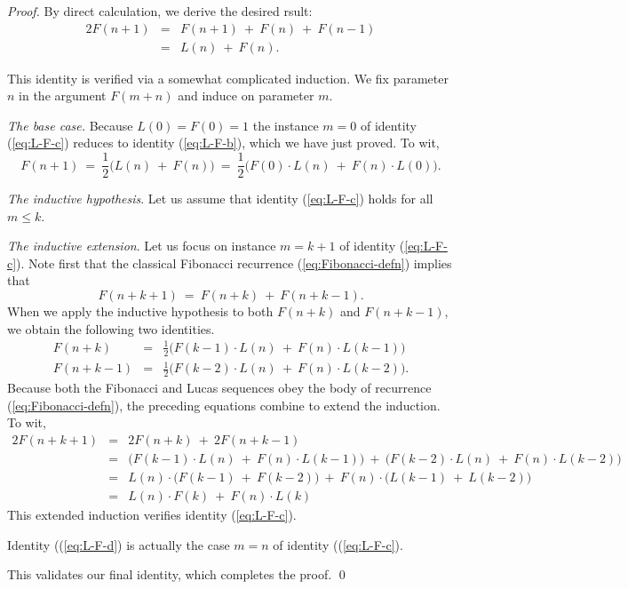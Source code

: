\begin{proof}
\bigskip

By direct calculation, we derive the desired rsult:
\begin{eqnarray*}
2 F(n+1) & = & F(n+1) \ + \ F(n) \ + \ F(n-1) \\
         & = & L(n) \ + \ F(n).
\end{eqnarray*}

\bigskip

This identity is verified via a somewhat complicated induction.  We
fix parameter $n$ in the argument $F(m+n)$ and induce on parameter $m$.

\medskip

\noindent
{\it The base case.}
Because $L(0) = F(0)= 1$ the instance $m=0$ of identity
(\ref{eq:L-F-c}) reduces to identity (\ref{eq:L-F-b}), which we have
just proved.  To wit,
\[ F(n+1) \ = \ \frac{1}{2} \big( L(n) \ + \ F(n) \big)
\ = \ \frac{1}{2} \big( F(0) \cdot L(n) \ + \ F(n) \cdot L(0) \big).
\]

\medskip 

\noindent
{\it The inductive hypothesis}.
Let us assume that identity (\ref{eq:L-F-c}) holds for all $m \leq k$.

\medskip

\noindent
{\it The inductive extension}.
Let us focus on instance $m = k+1$ of identity (\ref{eq:L-F-c}).  Note
first that the classical Fibonacci recurrence
(\ref{eq:Fibonacci-defn}) implies that
\[ F(n + k +1) \ = \ F(n + k) \ + \ F(n + k - 1). \]
When we apply the inductive hypothesis to both $F(n + k)$ and $F(n + k
- 1)$, we obtain the following two identities.
\begin{eqnarray*}
F(n + k) & = & \frac{1}{2} \big( F(k-1) \cdot L(n) \ + \ F(n) \cdot
L(k-1) \big) \\
F(n + k - 1) & = & \frac{1}{2} \big( F(k-2) \cdot L(n) \ + \ F(n) \cdot L(k-2) \big).
\end{eqnarray*}
Because both the Fibonacci and Lucas sequences obey the body of
recurrence (\ref{eq:Fibonacci-defn}), the preceding equations combine
to extend the induction.  To wit,
\begin{eqnarray*}
2 F(n + k +1) & = & 2 F(n + k) \ + \ 2 F(n + k - 1) \\
              & = & 
\big( F(k-1) \cdot L(n) \ + \ F(n) \cdot L(k-1) \big)
\ + \
\big( F(k-2) \cdot L(n) \ + \ F(n) \cdot L(k-2) \big) \\
              & = &
L(n) \cdot \big( F(k-1) \ + \ F(k-2) \big)
\ + \
F(n) \cdot \big( L(k-1) \ + \ L(k-2) \big) \\
              & = &
L(n) \cdot F(k) \ + \ F(n) \cdot L(k)
\end{eqnarray*}
This extended induction verifies identity (\ref{eq:L-F-c}).

\bigskip

Identity ((\ref{eq:L-F-d}) is actually the case $m=n$ of identity
((\ref{eq:L-F-c}).

This validates our final identity, which completes the proof.  \qed
\end{proof}


